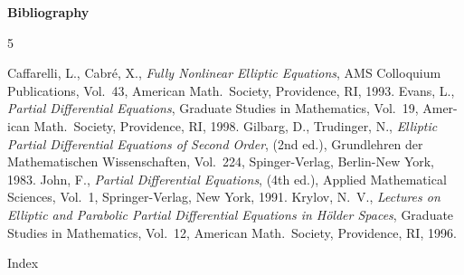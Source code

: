 \begin{center}
\Large\bfseries Bibliography
\end{center}

\begin{thebibliography}{5}

 Caffarelli, L., Cabr\'e, X., \emph{Fully Nonlinear Elliptic Equations}, AMS Colloquium Publications,
Vol.\ 43, American Math.\ Society, Providence, RI, 1993.
 Evans, L., \emph{Partial Differential Equations}, Graduate Studies in Mathematics, Vol.\ 19, Amer-
ican Math.\ Society, Providence, RI, 1998.
 Gilbarg, D., Trudinger, N., \emph{Elliptic Partial Differential Equations of Second Order}, (2nd ed.),
Grundlehren der Mathematischen Wissenschaften, Vol.\ 224, Spinger-Verlag, Berlin-New York,
1983.
 John, F., \emph{Partial Differential Equations}, (4th ed.), Applied Mathematical Sciences, Vol.\ 1,
Springer-Verlag, New York, 1991.
 Krylov, N.\ V., \emph{Lectures on Elliptic and Parabolic Partial Differential Equations in H\"older
Spaces}, Graduate Studies in Mathematics, Vol.\ 12, American Math.\ Society, Providence, RI,
1996.

\end{thebibliography}

\begin{center}
Index
\end{center}

